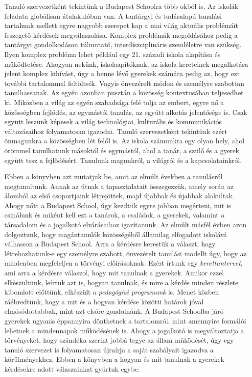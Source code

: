 Tanuló szervezetként tekintünk a Budapest Schoolra több okból is. Az iskolák feladata globálisan átalakulóban van. A tantárgyi és tudásalapú tanulási tartalmak mellett egyre nagyobb szerepet kap a mai világ aktuális problémáit feszegető kérdések megválaszolása. Komplex problémák megoldásához pedig a tantárgyi gondolkodáson túlmutató, interdiszciplináris szemléletre van szükség. Ilyen komplex probléma lehet például egy 21. századi iskola alapítása és működtetése. Ahogyan nekünk, iskolaapítóknak, az iskola kereteinek megalkotása jelent komplex kihívást, úgy a benne lévő gyerekek számára pedig az, hogy ezt további tartalommal feltöltsék. Vagyis önvezérelt módon és személyre szabottan tanulhassanak. Az egyén azonban pusztán a közösség kontextusában teljesedhet ki. Miközben a világ az egyén szabadsága felé tolja az embert, egyre nő a közösségben fejlődés, az egymástól tanulás, az együtt alkotás jelentősége is. Csak együtt leszünk képesek a világ technológiai, kulturális és kommunikációs változásaihoz folyamatosan igazodni. Tanuló szervezetként tekintünk ezért önmagunkra a közösségben lét felől is. Az iskola számunkra egy olyan hely, ahol örömmel tanulhatunk másoktól és egymástól, ahol a tanár, a szülő és a gyerek együtt tesz a fejlődésért. Tanulunk magunkról, a világról és a kapcsolatainkról.

Ebben a könyvben azt mutatjuk be, amit az elmúlt években a tanulásról megtanultunk. Annak az útnak a tapasztalatait összegezzük, amely során az álomból az első csoportjaink létrejöttek, majd újabbak és újabbak alakultak. Ahogy nőtt a Budapest School, úgy kezdtük egyre jobban megérteni, mit is csinálunk és miként kell ezt a tanárok, a családok, a gyerekek, valamint a társadalom és a jogalkotó elvárásaihoz igazítanunk. Az elmúlt másfél évben azon dolgoztunk, hogy magántanulók közösségéből államilag elfogadott iskolává válhasson a Budapest School. Arra a kérdésre kerestük a választ, hogy létrehozhatunk-e egy személyre szabott, önvezérelt tanulási modellt úgy, hogy az mindenben megfeleljen a törvényi előírásoknak. Ezért írtunk egy \emph{kerettantervet}, ami arra a kérdésre válaszol, hogy mit tanulnak a gyerekek. Amikor ezzel elkészültünk, leírtuk azt is, hogyan tanulnak, és mire a kérdés minden részlete kibomlott előttünk, elkészült a \emph{pedagógiai programunk} is. Menet közben ráébredtünk, hogy a mit és a hogyan kérdése közötti határok jóval elmósódottabbak, mint azt elsőre gondolnánk. A Budapest Schoolba járó gyerekek ugyanis éppannyira dönthetnek a tartalomról, mint amennyire formálói lehetnek a mindennapok működésének is. Ahogy a jogalkotó is megváltoztatja a törvényeket, hogy szándéka szerint jobbá tegye az állam működését, úgy egy tanuló szervezet is folyamatosan újraírja a saját szabályait igazodva a körülményekhez. Ebben a könyvben a hogyan és mit tanulnak a gyerekek kérdésekre adott válaszainkat gyúrtuk egybe.        

